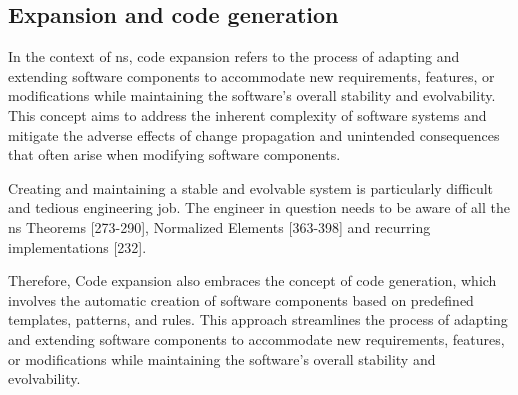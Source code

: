 \subsection{Expansion and code generation} \label{subsec:expansion}

In the context of \gls{ns}, code expansion refers to the process of adapting and extending
software components to accommodate new requirements, features, or modifications while
maintaining the software's overall stability and evolvability. This concept aims to
address the inherent complexity of software systems and mitigate the adverse effects of
change propagation and unintended consequences that often arise when modifying software
components.

Creating and maintaining a stable and evolvable system is particularly difficult and
tedious engineering job. The engineer in question needs to be aware of all the \gls{ns}
Theorems \parencite*{mannaert_normalized_2016}[273-290], Normalized Elements
\parencite*{mannaert_normalized_2016}[363-398] and recurring implementations
\parencite*{mannaert_normalized_2016}[232].

Therefore, Code expansion also embraces the concept of code generation, which involves the
automatic creation of software components based on predefined templates, patterns, and
rules. This approach streamlines the process of adapting and extending software components
to accommodate new requirements, features, or modifications while maintaining the
software's overall stability and evolvability.